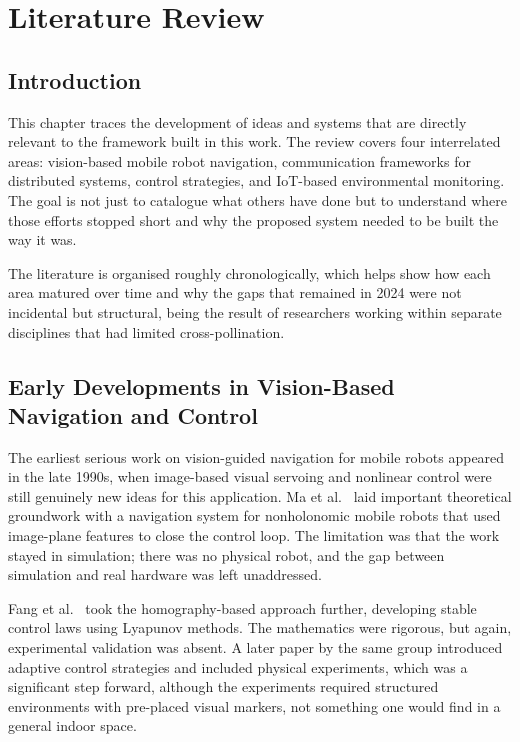 
\chapter{Literature Review}

\section{Introduction}

This chapter traces the development of ideas and systems that are
directly relevant to the framework built in this work. The review
covers four interrelated areas: vision-based mobile robot navigation,
communication frameworks for distributed systems, control strategies,
and IoT-based environmental monitoring. The goal is not just to
catalogue what others have done but to understand where those efforts
stopped short and why the proposed system needed to be built the way
it was.

The literature is organised roughly chronologically, which helps show
how each area matured over time and why the gaps that remained in 2024
were not incidental but structural, being the result of researchers working
within separate disciplines that had limited cross-pollination.

\section{Early Developments in Vision-Based Navigation and Control}

The earliest serious work on vision-guided navigation for mobile robots
appeared in the late 1990s, when image-based visual servoing and
nonlinear control were still genuinely new ideas for this application.
Ma et al.\ \cite{r5} laid important theoretical groundwork with a
navigation system for nonholonomic mobile robots that used image-plane
features to close the control loop. The limitation was that the work
stayed in simulation; there was no physical robot, and the gap between
simulation and real hardware was left unaddressed.

Fang et al.\ \cite{r6} took the homography-based approach further,
developing stable control laws using Lyapunov methods. The mathematics
were rigorous, but again, experimental validation was absent. A later
paper by the same group \cite{r7} introduced adaptive control
strategies and included physical experiments, which was a significant
step forward, although the experiments required structured environments
with pre-placed visual markers, not something one would find in a
general indoor space.

